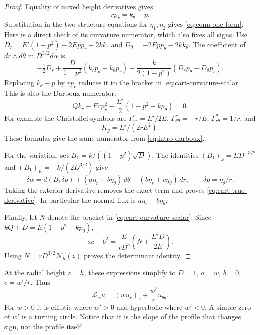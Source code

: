 \begin{proof}
Equality of mixed height derivatives gives
\begin{equation}\label{eq:height-compatibility}
 rp_r=k_\theta-p.
\end{equation}
Substitution in the two structure equations for $\eta_1,\eta_2$
gives \eqref{eq:conn-one-form}. Here is a direct check of its
curvature numerator, which also fixes all signs. Use
$D_r=E'(1-p^2)-2Epp_r-2kk_r$ and
$D_\theta=-2Epp_\theta-2kk_\theta$. The coefficient of
$dr\wedge d\theta$ in $D^{3/2}d\alpha$ is
\[
 -\tfrac12D_r+\frac{D}{1-p^2}(k_rp_\theta-k_\theta p_r)
 -\frac{k}{2(1-p^2)}(D_rp_\theta-D_\theta p_r).
\]
Replacing $k_\theta-p$ by $rp_r$ reduces it to the bracket in
\eqref{eq:cart-curvature-scalar}. This is also the Darboux numerator:
\begin{equation}\label{eq:darboux-numerator}
 Qk_r-Erp_r^2-\frac{E'}2(1-p^2+kp_\theta)=0.
\end{equation}
For example the Christoffel symbols are
$\Gamma^r_{rr}=E'/2E$, $\Gamma^r_{\theta\theta}=-r/E$,
$\Gamma^\theta_{r\theta}=1/r$, and
\begin{equation}\label{eq:radial-curvature}
 K_g=E'/(2rE^2).
\end{equation}
These formulas give the same numerator from
\eqref{eq:intro-darboux}.

For the variation, set $B_1=k/((1-p^2)\sqrt D)$. The identities
$(B_1)_k=ED^{-3/2}$ and $(B_1)_E=-k/(2D^{3/2})$ give
\begin{equation}\label{eq:conn-exact-variation}
 \delta\alpha=d(B_1\delta p)
  +(a\eta_r+b\eta_\theta)\,d\theta
  -(b\eta_r+c\eta_\theta)\,dr,
 \qquad\delta p=\eta_\theta/r.
\end{equation}
Taking the exterior derivative removes the exact term and proves
\eqref{eq:cart-true-derivative}. In particular the normal flux is
$a\eta_r+b\eta_\theta$.

Finally, let $N$ denote the bracket in
\eqref{eq:cart-curvature-scalar}. Since
$kQ+D=E(1-p^2+kp_\theta)$,
\[
 ac-b^2=\frac E{rD^3}\left(N+\frac{E'D}{2E}\right).
\]
Using $N=rD^{3/2}\mathcal N_h(z)$ proves the determinant identity.
\end{proof}

At the radial height $z=h$, these expressions simplify to
$D=1$, $a=w$, $b=0$, $c=w'/r$. Thus
\begin{equation}\label{eq:intro-linearization}
 \mathscr L_wu=(wu_r)_r+\frac{w'}r u_{\theta\theta}.
\end{equation}
For $w>0$ it is elliptic where $w'>0$ and hyperbolic where $w'<0$.
A simple zero of $w'$ is a turning circle. Notice that it is the
slope of the profile that changes sign, not the profile itself.


